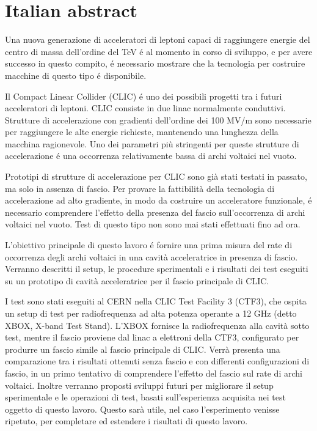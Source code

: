 \chapter*{Italian abstract}

Una nuova generazione di acceleratori di leptoni capaci di raggiungere energie del centro di massa dell'ordine del TeV é al momento in corso di sviluppo, e  per avere successo in questo compito, é necessario mostrare che la tecnologia per costruire macchine di questo tipo é disponibile.

Il Compact Linear Collider (CLIC) é uno dei possibili progetti tra i futuri acceleratori di leptoni. CLIC consiste in due linac normalmente conduttivi. Strutture di accelerazione con gradienti dell'ordine dei 100 MV/m sono necessarie per raggiungere le alte energie richieste, mantenendo una lunghezza della macchina ragionevole. Uno dei parametri pi\`u stringenti per queste strutture di accelerazione é una occorrenza relativamente bassa di archi voltaici nel vuoto.

Prototipi di strutture di accelerazione per CLIC sono gi\`a stati testati in passato, ma solo in assenza di fascio. Per provare la fattibilit\`a della tecnologia di accelerazione ad alto gradiente, in modo da costruire un acceleratore funzionale, é necessario comprendere l'effetto della presenza del fascio sull'occorrenza di archi voltaici nel vuoto. Test di questo tipo non sono mai stati effettuati fino ad ora.

L'obiettivo principale di questo lavoro é fornire una prima misura del rate di occorrenza degli archi voltaici in una cavit\`a acceleratrice in presenza di fascio. Verranno descritti il setup, le procedure sperimentali e i risultati dei test eseguiti su un prototipo di cavit\`a acceleratrice per il fascio principale di CLIC.

I test sono stati eseguiti al CERN nella CLIC Test Facility 3 (CTF3), che ospita un setup di test per radiofrequenza ad alta potenza operante a 12 GHz (detto XBOX, X-band Test Stand). L'XBOX fornisce la radiofrequenza alla cavit\`a sotto test, mentre il fascio proviene dal linac a elettroni della CTF3, configurato per produrre un fascio simile al fascio principale di CLIC. Verr\`a presenta una comparazione tra i risultati ottenuti senza fascio e con differenti configurazioni di fascio, in un primo tentativo di comprendere l'effetto del fascio sul rate di archi voltaici. Inoltre verranno proposti sviluppi futuri per migliorare il setup sperimentale e le operazioni di test, basati sull'esperienza acquisita nei test oggetto di questo lavoro. Questo sar\`a utile, nel caso l'esperimento venisse ripetuto, per completare ed estendere i risultati di questo lavoro.